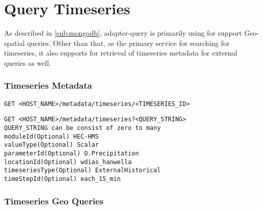 \section{Query Timeseries}

As described in \ref{sub:mongodb}, adapter-query is primarily using for support Geo-spatial queries. Other than that, as the primary service for searching for timeseries, it also supports for retrieval of timeseries metadata for external queries as well.

\subsubsection{Timeseries Metadata}
\begin{lstlisting}
GET <HOST_NAME>/metadata/timeseries/<TIMESERIES_ID>
\end{lstlisting}

\begin{lstlisting}
GET <HOST_NAME>/metadata/timeseries?<QUERY_STRING>
QUERY_STRING can be consist of zero to many 
moduleId(Optional) HEC-HMS
valueType(Optional) Scalar
parameterId(Optional) O.Precipitation
locationId(Optional) wdias_hanwella
timeseriesType(Optional) ExternalHistorical
timeStepId(Optional) each_15_min
\end{lstlisting}

\subsubsection{Timeseries Geo Queries}
